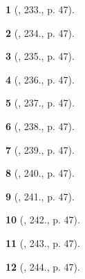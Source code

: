 \documentclass{article}
\newtheorem{baitoan}{}
\begin{document}
\begin{baitoan}[\cite{Binh_Toan_8_tap_1}, 233., p. 47]
	
\end{baitoan}

\begin{baitoan}[\cite{Binh_Toan_8_tap_1}, 234., p. 47]
	
\end{baitoan}

\begin{baitoan}[\cite{Binh_Toan_8_tap_1}, 235., p. 47]
	
\end{baitoan}

\begin{baitoan}[\cite{Binh_Toan_8_tap_1}, 236., p. 47]
	
\end{baitoan}

\begin{baitoan}[\cite{Binh_Toan_8_tap_1}, 237., p. 47]
	
\end{baitoan}

\begin{baitoan}[\cite{Binh_Toan_8_tap_1}, 238., p. 47]
	
\end{baitoan}

\begin{baitoan}[\cite{Binh_Toan_8_tap_1}, 239., p. 47]
	
\end{baitoan}

\begin{baitoan}[\cite{Binh_Toan_8_tap_1}, 240., p. 47]
	
\end{baitoan}

\begin{baitoan}[\cite{Binh_Toan_8_tap_1}, 241., p. 47]
	
\end{baitoan}

\begin{baitoan}[\cite{Binh_Toan_8_tap_1}, 242., p. 47]
	
\end{baitoan}

\begin{baitoan}[\cite{Binh_Toan_8_tap_1}, 243., p. 47]
	
\end{baitoan}

\begin{baitoan}[\cite{Binh_Toan_8_tap_1}, 244., p. 47]
	
\end{baitoan}
\end{document}
